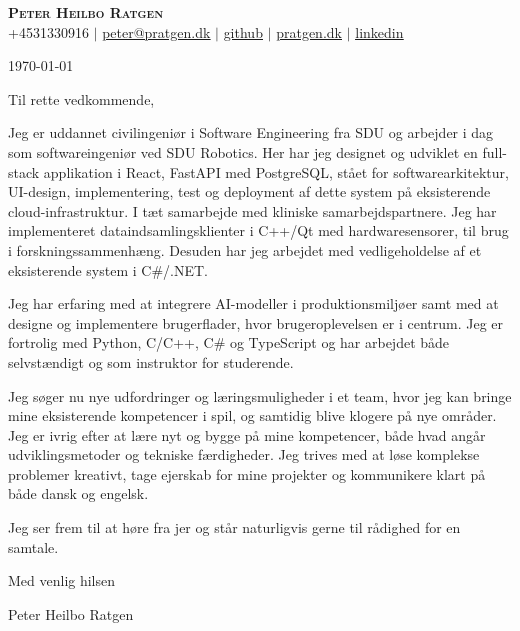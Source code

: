 \documentclass{article}
\begin{document}
\begin{center}
  \textbf{\huge{\scshape{Peter Heilbo Ratgen}}}\\ 
  \vspace{0.2cm}
  \small +4531330916 $|$
  \href{mailto:peter@pratgen.dk}{\underline{peter@pratgen.dk}} $|$
  \href{https://github.com/ratgen }{\underline{github}} $|$
  \href{https://pratgen.dk}{\underline{pratgen.dk}} $|$
  \href{https://www.linkedin.com/in/peter-ratgen-a1236529/}{\underline{linkedin}}
\end{center}
\vspace{0.5cm}

\begin{flushright}
  \today
\end{flushright}
\vspace{1cm}

Til rette vedkommende, \vspace{\baselineskip}


Jeg er uddannet civilingeniør i Software Engineering fra SDU og arbejder i dag
som softwareingeniør ved SDU Robotics. Her har jeg designet og udviklet 
en full-stack applikation i React, FastAPI med PostgreSQL, stået for
softwarearkitektur, UI-design, implementering, test og deployment af dette
system på eksisterende cloud-infrastruktur. I tæt samarbejde med kliniske
samarbejdspartnere.
Jeg har implementeret dataindsamlingsklienter i C++/Qt med hardwaresensorer,
til brug i forskningssammenhæng. Desuden har jeg arbejdet med vedligeholdelse af
et eksisterende system i C\#/.NET. 
\vspace{\baselineskip}

Jeg har erfaring med at integrere AI-modeller i produktionsmiljøer samt med at
designe og implementere brugerflader, hvor brugeroplevelsen er i centrum. Jeg er
fortrolig med Python, C/C++, C\# og TypeScript og har arbejdet både
selvstændigt og som instruktor for studerende.

\vspace{\baselineskip}

Jeg søger nu nye udfordringer og læringsmuligheder i et team, hvor jeg kan
bringe mine eksisterende kompetencer i spil, og samtidig blive klogere på nye
områder. Jeg er ivrig efter at lære nyt og bygge på mine kompetencer, både
hvad angår udviklingsmetoder og tekniske færdigheder. Jeg trives med at løse
komplekse problemer kreativt, tage ejerskab for mine projekter og kommunikere
klart på både dansk og engelsk.
\vspace{\baselineskip}

Jeg ser frem til at høre fra jer og står naturligvis gerne til rådighed for en samtale.
\vspace{\baselineskip}

\begin{flushleft}
Med venlig hilsen 

\vspace{\baselineskip} Peter Heilbo Ratgen
\end{flushleft}
\end{document}
